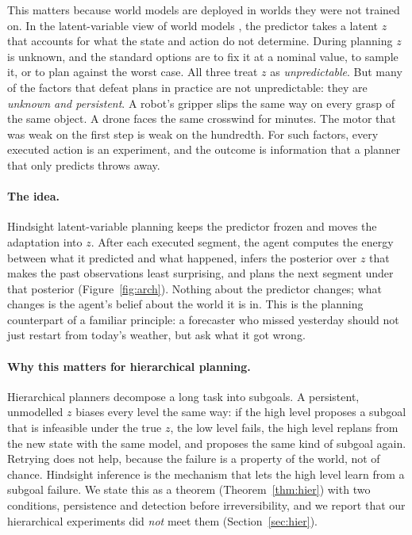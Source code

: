 \documentclass[11pt]{article}
\begin{document}
This matters because world models are deployed in worlds they were not trained on. In the latent-variable view of
world models \citep{lecun2022path}, the predictor takes a latent $z$ that accounts for what the state and action do not
determine. During planning $z$ is unknown, and the standard options are to fix it at a nominal value, to sample it, or to
plan against the worst case. All three treat $z$ as \emph{unpredictable}. But many of the factors that defeat plans in
practice are not unpredictable: they are \emph{unknown and persistent}. A robot's gripper slips the same way on every
grasp of the same object. A drone faces the same crosswind for minutes. The motor that was weak on the first step is weak
on the hundredth. For such factors, every executed action is an experiment, and the outcome is information that a planner
that only predicts throws away.

\paragraph{The idea.} Hindsight latent-variable planning keeps the predictor frozen and moves the adaptation into $z$.
After each executed segment, the agent computes the energy between what it predicted and what happened, infers the
posterior over $z$ that makes the past observations least surprising, and plans the next segment under that posterior
(Figure~\ref{fig:arch}). Nothing about the predictor changes; what changes is the agent's belief about the world it is
in. This is the planning counterpart of a familiar principle: a forecaster who missed yesterday should not just restart
from today's weather, but ask what it got wrong.

\paragraph{Why this matters for hierarchical planning.} Hierarchical planners
\citep{lecun2022path,hjepa_2610_06805} decompose a long task into subgoals. A persistent, unmodelled $z$ biases every
level the same way: if the high level proposes a subgoal that is infeasible under the true $z$, the low level fails, the
high level replans from the new state with the same model, and proposes the same kind of subgoal again. Retrying does
not help, because the failure is a property of the world, not of chance. Hindsight inference is the mechanism that
lets the high level learn from a subgoal failure. We state this as a theorem (Theorem~\ref{thm:hier}) with two
conditions, persistence and detection before irreversibility, and we report that our hierarchical experiments did
\emph{not} meet them (Section~\ref{sec:hier}).
\end{document}
